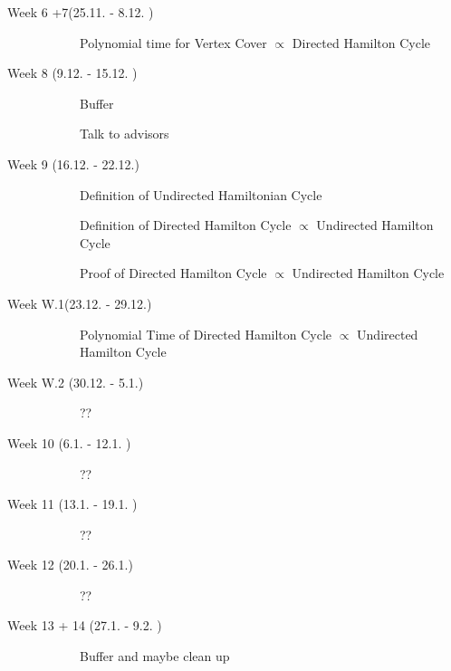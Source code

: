 \documentclass[11pt,a4paper]{scrartcl}
\begin{document}
\begin{description}
		\item[Week 6 +7(25.11. - 8.12. )] \hfill
		\begin{description}
			\item[\Square] Polynomial time for Vertex Cover $\varpropto$ Directed Hamilton Cycle
		\end{description}
		\item[Week 8 (9.12. - 15.12. )] \hfill 
		\begin{description}
			\item[\Square] Buffer
			\item[\Square] Talk to advisors
		\end{description}
		\item[Week 9 (16.12. - 22.12.)]\hfill 
		\begin{description}
			\item[\Square] Definition of Undirected Hamiltonian Cycle
			\item[\Square] Definition of Directed Hamilton Cycle $\varpropto$ Undirected Hamilton Cycle
			\item[\Square] Proof of Directed Hamilton Cycle $\varpropto$ Undirected Hamilton Cycle
		\end{description}
		\item[Week W.1(23.12. - 29.12.)] \hfill
		\begin{description}
			\item[\Square] Polynomial Time of Directed Hamilton Cycle $\varpropto$ Undirected Hamilton Cycle
		\end{description}
		\item[Week W.2 (30.12. - 5.1.)] \hfill 
		\begin{description}
			\item[\Square] ??
		\end{description}
		\item[Week 10 (6.1. - 12.1. )]  \hfill 
		\begin{description}
			\item[\Square] ??
		\end{description}
		\item[Week 11 (13.1. - 19.1. )]  \hfill 
		\begin{description}
			\item[\Square] ??
		\end{description}
		\item[Week 12 (20.1. - 26.1.)]  \hfill 
		\begin{description}
			\item[\Square] ??
		\end{description}
		\item[Week 13 + 14 (27.1. - 9.2. )]  \hfill 
		\begin{description}
			\item[\Square] Buffer and maybe clean up
		\end{description}
	\end{description}
\end{document}
